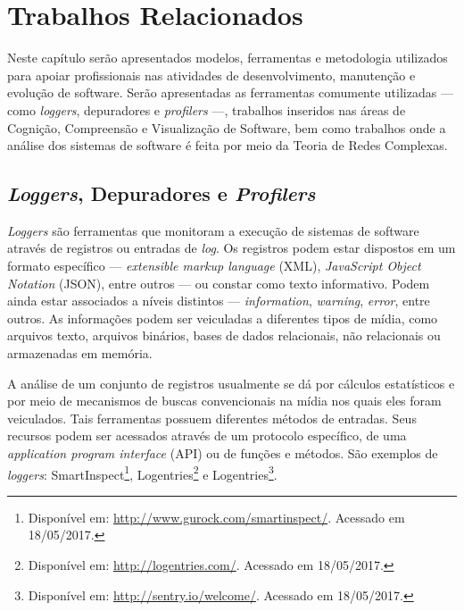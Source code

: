 
%

\chapter{Trabalhos Relacionados}
\label{chap:RelatedWork}

Neste capítulo serão apresentados modelos, ferramentas e metodologia utilizados
para apoiar profissionais nas atividades de desenvolvimento, manutenção e
evolução de software. Serão apresentadas as ferramentas comumente utilizadas ---
como \textit{loggers}, depuradores e \textit{profilers} ---, trabalhos inseridos
nas áreas de Cognição, Compreensão e Visualização de Software, bem como
trabalhos onde a análise dos sistemas de software é feita por meio da Teoria de
Redes Complexas.

\section{\textit{Loggers}, Depuradores e \textit{Profilers}}
\label{sec:Loggers}

\textit{Loggers} são ferramentas que monitoram a execução de sistemas de
software através de registros ou entradas de \textit{log}.
Os registros podem estar dispostos em um formato específico ---
\textit{extensible markup language} (XML), \textit{JavaScript Object Notation} (JSON),
entre outros --- ou constar como texto informativo.
Podem ainda estar associados a níveis distintos --- \textit{information},
\textit{warning}, \textit{error}, entre outros.
As informações podem ser veiculadas a diferentes tipos de mídia, como arquivos
texto, arquivos binários, bases de dados relacionais, não relacionais ou
armazenadas em memória.

A análise de um conjunto de registros usualmente se dá por cálculos estatísticos
e por meio de mecanismos de buscas convencionais na mídia nos quais eles foram
veiculados.
Tais ferramentas possuem diferentes métodos de entradas. Seus recursos podem ser
acessados através de um protocolo específico, de uma
\textit{application program interface} (API) ou de funções e métodos.
São exemplos de \textit{loggers}:
SmartInspect\footnote{Disponível em: \href{http://www.gurock.com/smartinspect/}{http://www.gurock.com/smartinspect/}. Acessado em 18/05/2017.},
Logentries\footnote{Disponível em: \href{http://logentries.com/}{http://logentries.com/}. Acessado em 18/05/2017.} e
Logentries\footnote{Disponível em: \href{http://sentry.io/welcome/}{http://sentry.io/welcome/}. Acessado em 18/05/2017.}.


